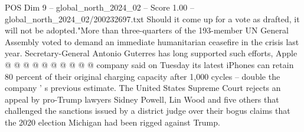 \begin{textsample}{POS Dim 9 – global\_north\_2024\_02 – Score 1.00 – global\_north\_2024\_02/200232697.txt}
Should it come up for a vote as drafted, it will not be adopted."More than three-quarters of the 193-member UN General Assembly voted to demand an immediate humanitarian ceasefire in the crisis last year.
Secretary-General Antonio Guterres has long supported such efforts, Apple @ @ @ @ @ @ @ @ @ @ company said on Tuesday its latest iPhones can retain 80 percent of their original charging capacity after 1,000 cycles -- double the company ' s previous estimate.
The United States Supreme Court rejects an appeal by pro-Trump lawyers Sidney Powell, Lin Wood and five others that challenged the sanctions issued by a district judge over their bogus claims that the 2020 election Michigan had been rigged against Trump.

\end{textsample}
